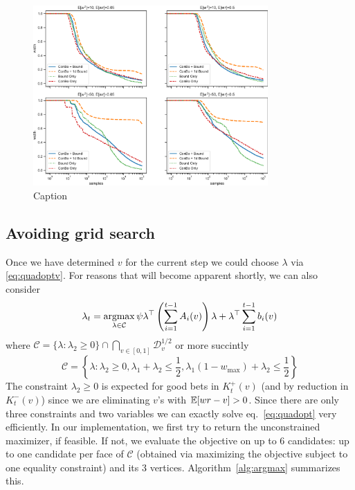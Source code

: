 \begin{figure}
    \centering
    \includegraphics[width=0.8\textwidth]{width}
    \caption{Caption}
    \label{fig:my_label}
\end{figure}

\subsection{Avoiding grid search}
\label{sec:avoid-grid}
Once we have determined $v$ for the current step we could 
choose $\lambda$ via \eqref{eq:quadoptv}. For reasons 
that will become apparent shortly, we can also consider
\begin{equation}
\lambda_t = \operatorname*{argmax}_{\lambda \in \mathcal{C}}
\psi  \lambda^\top \left(\sum_{i=1}^{t-1} A_i(v)\right) \lambda 
+ \lambda^\top \sum_{i=1}^{t-1} b_i(v)
\label{eq:quadopt}
\end{equation}
where $\mathcal{C}=\{\lambda: \lambda_2 \geq 0\}\cap \bigcap_{v\in [0,1]} \mathcal{D}_v^{1/2}$
or more succintly
$$
\mathcal{C} = \left\{\lambda: \lambda_2\geq 0, 
\lambda_1 + \lambda_2 \leq \frac{1}{2},
\lambda_1 \left(1-w_{\max}\right) + \lambda_2 \leq  \frac{1}{2}
\right\}
$$
The constraint $\lambda_2\geq 0$ is expected
for good bets in $K_t^+(v)$ (and by reduction
in $K_t^-(v)$) since we are eliminating 
$v$'s with $\mathbb{E}[wr-v]>0$. Since there are 
only three constraints and two variables
we can exactly solve eq.~\eqref{eq:quadopt}
very efficiently. In our implementation, we
first try to return the unconstrained maximizer, if feasible. 
If not, we evaluate the objective on up to 6 candidates: 
up to one candidate per face of $\mathcal{C}$ 
(obtained via maximizing the objective subject to one equality constraint) 
and its 3 vertices. Algorithm~\ref{alg:argmax} summarizes this.

